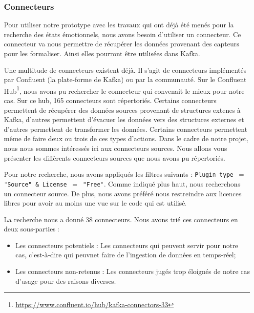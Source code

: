 \documentclass{article}
\begin{document}
		\subsubsection{Connecteurs}
			Pour utiliser notre prototype avec les travaux qui ont déjà été menés pour la recherche des états émotionnels, nous avons besoin d'utiliser un connecteur.
			Ce connecteur va nous permettre de récupérer les données provenant des capteurs pour les formaliser.
			Ainsi elles pourront être utilisées dans Kafka.\par
			Une multitude de connecteurs existent déjà. 
			Il s'agit de connecteurs implémentés par Confluent (la plate-forme de Kafka) ou par la communauté.
			Sur le Confluent Hub\footnote{\href{https://www.confluent.io/hub/kafka-connectors-33}{https://www.confluent.io/hub/kafka-connectors-33}}, nous avons pu rechercher le connecteur qui convenait le mieux pour notre cas.
			Sur ce hub, 165 connecteurs sont répertoriés.
			Certains connecteurs permettent de récupérer des données sources provenant de structures extenes à Kafka, d'autres permettent d'évacuer les données vers des structures externes et d'autres permettent de transformer les données.
			Certains connecteurs permettent même de faire deux ou trois de ces types d'actions. 
			Dans le cadre de notre projet, nous nous sommes intéressés ici aux connecteurs sources.
			Nous allons vous présenter les différents connecteurs sources que nous avons pu répertoriés.\par
			Pour notre recherche, nous avons appliqués les filtres suivants : \newline
			\texttt{Plugin type $=$ "Source" \& License $=$ "Free"}.\newline
			Comme indiqué plus haut, nous recherchons un connecteur source.
			De plus, nous avons préféré nous restreindre aux licences libres pour avoir au moins une vue sur le code qui est utilisé.\par
			La recherche nous a donné 38 connecteurs.
			Nous avons trié ces connecteurs en deux sous-parties :
			\begin{itemize}
				\item Les connecteurs potentiels : Les connecteurs qui peuvent servir pour notre cas, c'est-à-dire qui peuvnet faire de l’ingestion de données en temps-réel;
				\item Les connecteurs non-retenus : Les connecteurs jugés trop éloignés de notre cas d’usage pour des raisons diverses.
			\end{itemize}
\end{document}
